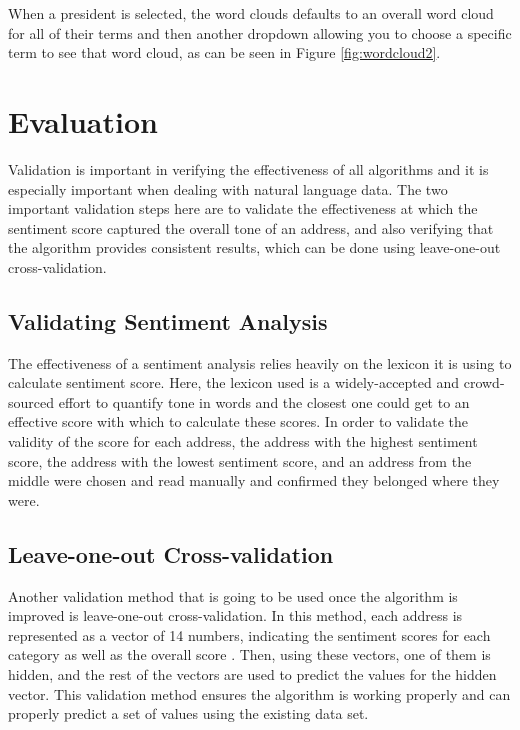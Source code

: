 \documentclass[acmtog, review, screen]{acmart}
\begin{document}
When a president is selected, the word clouds defaults to an overall word cloud for all of their terms and then another dropdown allowing you to choose a specific term to see that word cloud, as can be seen in Figure \ref{fig:wordcloud2}.

\section{Evaluation}
Validation is important in verifying the effectiveness of all algorithms and it is especially important when dealing with natural language data.
The two important validation steps here are to validate the effectiveness at which the sentiment score captured the overall tone of an address, and also verifying that the algorithm provides consistent results, which can be done using leave-one-out cross-validation.

\subsection{Validating Sentiment Analysis}
The effectiveness of a sentiment analysis relies heavily on the lexicon it is using to calculate sentiment score.
Here, the lexicon used is a widely-accepted and crowd-sourced effort to quantify tone in words and the closest one could get to an effective score with which to calculate these scores.
In order to validate the validity of the score for each address, the address with the highest sentiment score, the address with the lowest sentiment score, and an address from the middle were chosen and read manually and confirmed they belonged where they were.

\subsection{Leave-one-out Cross-validation}
Another validation method that is going to be used once the algorithm is improved is leave-one-out cross-validation.
In this method, each address is represented as a vector of 14 numbers, indicating the sentiment scores for each category as well as the overall score \cite{validation}.
Then, using these vectors, one of them is hidden, and the rest of the vectors are used to predict the values for the hidden vector.
This validation method ensures the algorithm is working properly and can properly predict a set of values using the existing data set.
\end{document}
